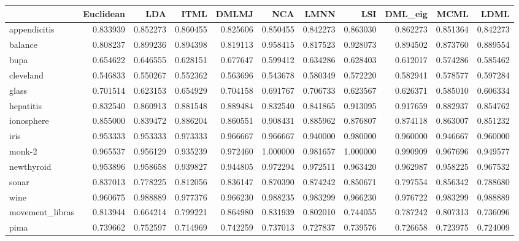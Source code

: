 \begin{tabular}{lrrrrrrrrrr}
\toprule
{} &  Euclidean &       LDA &      ITML &     DMLMJ &       NCA &      LMNN &       LSI &   DML\_eig &      MCML &      LDML \\
\midrule
appendicitis    &   0.833939 &  0.852273 &  0.860455 &  0.825606 &  0.850455 &  0.842273 &  0.863030 &  0.862273 &  0.851364 &  0.842273 \\
balance         &   0.808237 &  0.899236 &  0.894398 &  0.819113 &  0.958415 &  0.817523 &  0.928073 &  0.894502 &  0.873760 &  0.889554 \\
bupa            &   0.654622 &  0.646555 &  0.628151 &  0.677647 &  0.599412 &  0.634286 &  0.628403 &  0.612017 &  0.574286 &  0.585462 \\
cleveland       &   0.546833 &  0.550267 &  0.552362 &  0.563696 &  0.543678 &  0.580349 &  0.572220 &  0.582941 &  0.578577 &  0.597284 \\
glass           &   0.701514 &  0.623153 &  0.654929 &  0.704158 &  0.691767 &  0.706733 &  0.623567 &  0.626371 &  0.585010 &  0.606334 \\
hepatitis       &   0.832540 &  0.860913 &  0.881548 &  0.889484 &  0.832540 &  0.841865 &  0.913095 &  0.917659 &  0.882937 &  0.854762 \\
ionosphere      &   0.855000 &  0.839472 &  0.886204 &  0.860551 &  0.908431 &  0.885962 &  0.876807 &  0.874118 &  0.863007 &  0.851232 \\
iris            &   0.953333 &  0.953333 &  0.973333 &  0.966667 &  0.966667 &  0.940000 &  0.980000 &  0.960000 &  0.946667 &  0.960000 \\
monk-2          &   0.965537 &  0.956129 &  0.935239 &  0.972460 &  1.000000 &  0.981657 &  1.000000 &  0.990909 &  0.967696 &  0.949577 \\
newthyroid      &   0.953896 &  0.958658 &  0.939827 &  0.944805 &  0.972294 &  0.972511 &  0.963420 &  0.962987 &  0.958225 &  0.967532 \\
sonar           &   0.837013 &  0.778225 &  0.812056 &  0.836147 &  0.870390 &  0.874242 &  0.850671 &  0.797554 &  0.856342 &  0.788680 \\
wine            &   0.960675 &  0.988889 &  0.977376 &  0.966230 &  0.988235 &  0.983299 &  0.966230 &  0.976722 &  0.983299 &  0.988889 \\
movement\_libras &   0.813944 &  0.664214 &  0.799221 &  0.864980 &  0.831939 &  0.802010 &  0.744055 &  0.787242 &  0.807313 &  0.736096 \\
pima            &   0.739662 &  0.752597 &  0.714969 &  0.742259 &  0.737013 &  0.727837 &  0.739576 &  0.726658 &  0.723975 &  0.724009 \\

\end{tabular}
